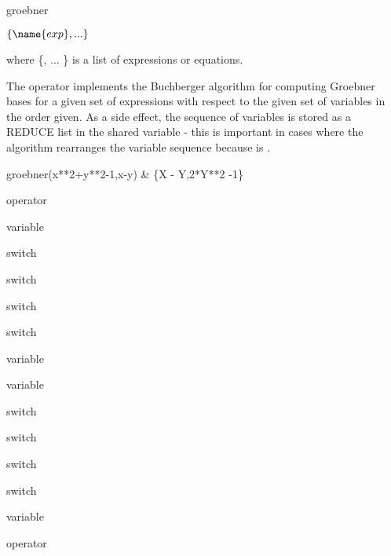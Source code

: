 \begin{Operator}{groebner}
\begin{Syntax}

  \(\{\name{exp}, ...\}\)

\end{Syntax}
where \{, ... \} is a list of
expressions or equations.


The operator  implements the Buchberger algorithm
for computing Groebner bases for a given set of
expressions with respect to the given set of variables in the order
given.  As a side effect, the sequence of variables is stored as a REDUCE list
in the shared variable  - this is important in cases
where the algorithm rearranges the variable sequence because 
is .

\begin{Examples}
   groebner({x**2+y**2-1,x-y})  &  \{X - Y,2*Y**2 -1\}
\end{Examples}
\begin{Related}
\item[ \nameref{groebnerf} operator]
\item[ \nameref{gvarslast} variable]
\item[ \nameref{groebopt} switch]
\item[ \nameref{groebprereduce} switch]
\item[ \nameref{groebfullreduction} switch]
\item[ \nameref{gltbasis} switch]
\item[ \nameref{gltb} variable]
\item[ \nameref{glterms} variable]
\item[ \nameref{groebstat} switch]
\item[ \nameref{trgroeb} switch]
\item[ \nameref{trgroebs} switch]
\item[ \nameref{groebprot} switch]
\item[ \nameref{groebprotfile} variable]
\item[ \nameref{groebnert} operator]
\end{Related}
\end{Operator}

